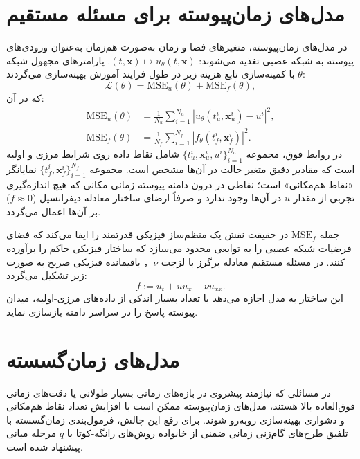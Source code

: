 \section{مدل‌های زمان‌پیوسته برای مسئله مستقیم}
\label{sec:continuous}

در مدل‌های زمان‌پیوسته، متغیرهای فضا و زمان به‌صورت هم‌زمان به‌عنوان ورودی‌های پیوسته به شبکه عصبی تغذیه می‌شوند: $(t,\mathbf{x}) \mapsto u_\theta(t,\mathbf{x})$. پارامترهای مجهول شبکه $\theta$ با کمینه‌سازی تابع هزینه زیر در طول فرایند آموزش بهینه‌سازی می‌گردند:
\begin{equation}
\mathcal{L}(\theta) = \mathrm{MSE}_u(\theta) + \mathrm{MSE}_f(\theta),
\label{eq:loss-forward}
\end{equation}
که در آن:
\begin{equation}
\begin{aligned}
\mathrm{MSE}_u(\theta) &= \frac{1}{N_u}\sum_{i=1}^{N_u} \left|u_\theta(t^i_u,\mathbf{x}^i_u) - u^i\right|^2, \\
\mathrm{MSE}_f(\theta) &= \frac{1}{N_f}\sum_{i=1}^{N_f} \left|f_\theta(t^i_f,\mathbf{x}^i_f)\right|^2.
\end{aligned}
\label{eq:loss-terms}
\end{equation}
در روابط فوق، مجموعه $\{t^i_u, \mathbf{x}^i_u, u^i\}_{i=1}^{N_u}$ شامل نقاط داده روی شرایط مرزی و اولیه است که مقادیر دقیق متغیر حالت در آن‌ها مشخص است. مجموعه $\{t^i_f, \mathbf{x}^i_f\}_{i=1}^{N_f}$ نمایانگر «نقاط هم‌مکانی» است؛ نقاطی در درون دامنه پیوسته زمانی-مکانی که هیچ اندازه‌گیری تجربی از مقدار $u$ در آن‌ها وجود ندارد و صرفاً ارضای ساختار معادله دیفرانسیل ($f \approx 0$) بر آن‌ها اعمال می‌گردد.

جمله $\mathrm{MSE}_f$ در حقیقت نقش یک منظم‌ساز فیزیکی قدرتمند را ایفا می‌کند که فضای فرضیات شبکه عصبی را به توابعی محدود می‌سازد که ساختار فیزیکی حاکم را برآورده کنند. در مسئله مستقیم معادله برگرز با لزجت $\nu$， باقیمانده فیزیکی صریح به صورت زیر تشکیل می‌گردد:
\begin{equation}
f := u_t + u u_x - \nu u_{xx}.
\label{eq:burgers-f}
\end{equation}
این ساختار به مدل اجازه می‌دهد با تعداد بسیار اندکی از داده‌های مرزی-اولیه، میدان پیوسته پاسخ را در سراسر دامنه بازسازی نماید.

\section{مدل‌های زمان‌گسسته}
\label{sec:discrete}

در مسائلی که نیازمند پیشروی در بازه‌های زمانی بسیار طولانی یا دقت‌های زمانی فوق‌العاده بالا هستند، مدل‌های زمان‌پیوسته ممکن است با افزایش تعداد نقاط هم‌مکانی و دشواری بهینه‌سازی روبه‌رو شوند. برای رفع این چالش، فرمول‌بندی زمان‌گسسته با تلفیق طرح‌های گام‌زنی زمانی ضمنی از خانواده روش‌های رانگه-کوتا با $q$ مرحله میانی پیشنهاد شده است.

